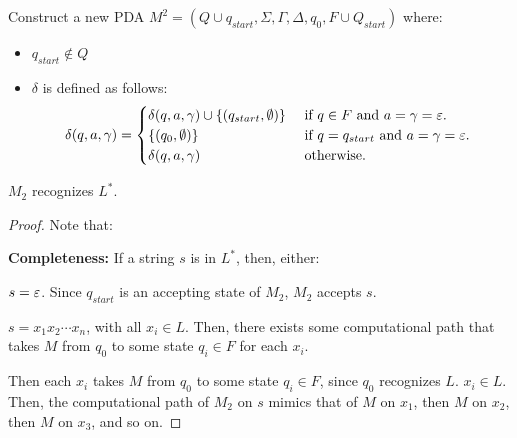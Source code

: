 \begin{problem}
\begin{enumalph}
\begin{Answer}
        \step
        Construct a new PDA $M^2 = (Q \cup q_{start}, \Sigma, \Gamma, \Delta, q_0, F \cup Q_{start})$ where:
        \begin{itemize}
          \item $q_{start} \notin Q$
          \item $\delta$ is defined as follows:
            \begin{align*}
              \delta(q, a, \gamma) = 
              \begin{cases}
                \delta(q, a, \gamma) \cup \left\{(q_{start}, \emptyset)\right\} & \text{ if $q \in F$ and $a = \gamma = \varepsilon$. } \\
                \left\{(q_0, \emptyset)\right\} & \text{ if $q = q_{start}$ and $a = \gamma = \varepsilon$. } \\
                \delta(q, a, \gamma) & \text{ otherwise. } \\
              \end{cases} 
            \end{align*}
          \end{itemize}
          \begin{claim}
            $M_2$ recognizes $L^*$.
            \begin{proof}
              Note that:

              \step
              \textbf{Completeness:}
                If a string $s$ is in $L^*$, then, either:
                \begin{enumroman}
                  \item $s = \varepsilon$. Since $q_{start}$ is an accepting state of $M_2$,
                    $M_2$ accepts $s$.
                  \item $s = x_1x_2 \cdots x_n$, with all $x_i \in L$.
                    Then, there exists some computational path that takes $M$
                    from $q_0$ to some state $q_i \in F$ for each $x_i$.

                \end{enumroman}
                Then each $x_i$ takes $M$ from $q_0$ to some state $q_i \in F$,
                since $q_0$ recognizes $L$.
                $x_i \in L$.
                Then, the computational path of $M_2$ on $s$ mimics that of $M$ on $x_1$,
                then $M$ on $x_2$, then $M$ on $x_3$, and so on.
            \end{proof}
          \end{claim}
      \end{Answer}
  \end{enumalph}
\end{problem}
